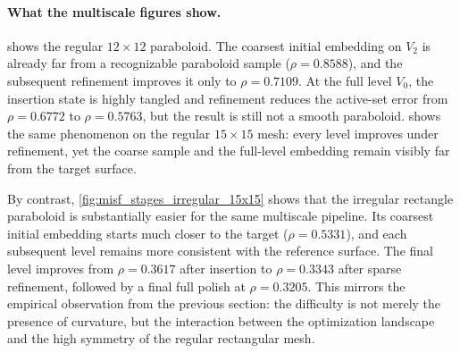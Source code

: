 \documentclass[11pt]{article}
\theoremstyle{definition}
\theoremstyle{plain}
\theoremstyle{remark}
\begin{document}
\paragraph{What the multiscale figures show.}
 shows the regular $12\times 12$
paraboloid.  The coarsest initial embedding on $V_2$ is already far from a
recognizable paraboloid sample ($\rho = 0.8588$), and the subsequent
refinement improves it only to $\rho = 0.7109$.  At the full level $V_0$, the
insertion state is highly tangled and refinement reduces the active-set error
from $\rho = 0.6772$ to $\rho = 0.5763$, but the result is still not a smooth
paraboloid.   shows the same phenomenon on
the regular $15\times 15$ mesh: every level improves under refinement, yet the
coarse sample and the full-level embedding remain visibly far from the target
surface.

By contrast, \cref{fig:misf_stages_irregular_15x15} shows that the irregular
rectangle paraboloid is substantially easier for the same multiscale pipeline.
Its coarsest initial embedding starts much closer to the target
($\rho = 0.5331$), and each subsequent level remains more consistent with the
reference surface.  The final level improves from $\rho = 0.3617$ after
insertion to $\rho = 0.3343$ after sparse refinement, followed by a final full
polish at $\rho = 0.3205$.  This mirrors the empirical observation from the
previous section: the difficulty is not merely the presence of curvature, but
the interaction between the optimization landscape and the high symmetry of the
regular rectangular mesh.
\end{document}
